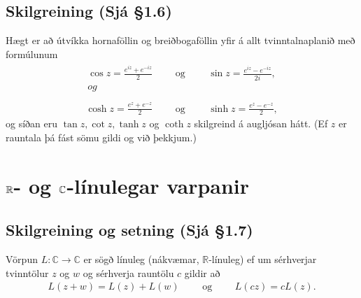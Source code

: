 \documentclass[a4paper,10pt,icelandic]{sphinxmanual}
\begin{document}
\subsection{Skilgreining  (Sjá \S{}1.6)}
\label{\detokenize{Kafli01:id11}}
Hægt er að útvíkka hornaföllin og
breiðbogaföllin yfir á allt tvinntalnaplanið með formúlunum
\begin{align*}\!\begin{aligned}
\cos z=\frac{e^{iz}+e^{-iz}}{2}\qquad\mbox{ og }\qquad
  \sin z=\frac{e^{iz}-e^{-iz}}{2i},\\
og\\
\end{aligned}\end{align*}\begin{equation*}
\begin{split}\cosh z=\frac{e^{z}+e^{-z}}{2}\qquad\mbox{ og }\qquad
\sinh z=\frac{e^{z}-e^{-z}}{2},\end{split}
\end{equation*}
og síðan eru \(\tan z, \cot z, \tanh z\) og \(\coth z\)
skilgreind á augljósan hátt. (Ef \(z\) er rauntala þá fást sömu
gildi og við þekkjum.)


\section{\protect\(\mathbb{R}\protect\)- og \protect\({\mathbb{C}}\protect\)-línulegar varpanir}
\label{\detokenize{Kafli01:mathbb-r-og-mathbb-c-linulegar-varpanir}}

\subsection{Skilgreining og setning (Sjá \S{}1.7)}
\label{\detokenize{Kafli01:skilgreining-og-setning-sja-1-7}}
Vörpun \(L:{\mathbb{C}}\rightarrow {\mathbb{C}}\) er sögð línuleg (nákvæmar,
\(\mathbb{R}\)-línuleg) ef um sérhverjar tvinntölur \(z\) og \(w\)
og sérhverja rauntölu \(c\) gildir að
\begin{equation*}
\begin{split}L(z+w)=L(z)+L(w)\qquad \mbox{ og }\qquad L(cz)=cL(z).\end{split}
\end{equation*}
\end{document}
